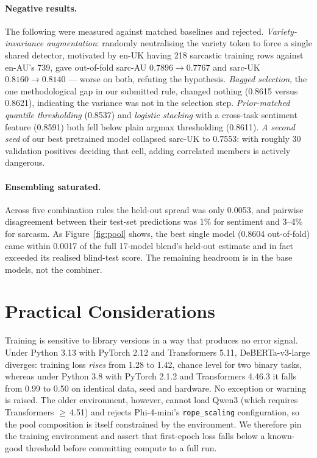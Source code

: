\documentclass[11pt]{article}
\begin{document}
\paragraph{Negative results.}
The following were measured against matched baselines and rejected. \emph{Variety-invariance
augmentation}: randomly neutralising the variety token to force a single
shared detector, motivated by en-UK having 218 sarcastic training rows against
en-AU's 739, gave out-of-fold sarc-AU $0.7896\!\rightarrow\!0.7767$ and
sarc-UK $0.8160\!\rightarrow\!0.8140$ --- worse on both, refuting the
hypothesis. \emph{Bagged selection}, the one methodological gap in our
submitted rule, changed nothing (0.8615 versus 0.8621), indicating the
variance was not in the selection step. \emph{Prior-matched quantile
thresholding} (0.8537) and \emph{logistic stacking} with a cross-task
sentiment feature (0.8591) both fell below plain argmax thresholding (0.8611).
\emph{A second seed} of our best pretrained model collapsed sarc-UK to 0.7553:
with roughly 30 validation positives deciding that cell, adding correlated
members is actively dangerous.

\paragraph{Ensembling saturated.}
Across five combination rules the held-out spread was only 0.0053, and
pairwise disagreement between their test-set predictions was 1\% for sentiment
and 3--4\% for sarcasm. As Figure~\ref{fig:pool} shows, the best single model
(0.8604 out-of-fold) came within 0.0017 of the full 17-model blend's held-out
estimate and in fact exceeded its realised blind-test score. The remaining
headroom is in the base models, not the combiner.

\section{Practical Considerations}

Training is sensitive to library versions in a way that produces no error
signal. Under Python 3.13 with PyTorch 2.12 and Transformers 5.11,
DeBERTa-v3-large diverges: training loss \emph{rises} from 1.28 to 1.42,
chance level for two binary tasks, whereas under Python 3.8 with PyTorch 2.1.2
and Transformers 4.46.3 it falls from 0.99 to 0.50 on identical data, seed and
hardware. No exception or warning is raised. The older environment, however,
cannot load Qwen3 (which requires Transformers $\geq$\,4.51) and rejects
Phi-4-mini's \texttt{rope\_scaling} configuration, so the pool composition is
itself constrained by the environment. We therefore pin the training
environment and assert that first-epoch loss falls below a known-good
threshold before committing compute to a full run.
\end{document}
